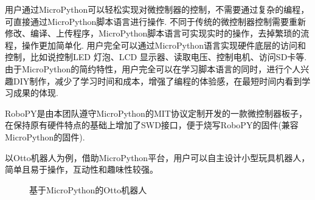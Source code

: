 \documentclass[UTF-8,12pt,a4paper]{ctexart}
\begin{document}
用户通过MicroPython可以轻松实现对微控制器的控制，不需要通过复杂的编程，可直接通过MicroPython脚本语言进行操作.
不同于传统的微控制器控制需要重新修改、编译、上传程序，MicroPython脚本语言可实现实时的操作，去掉繁琐的流程，操作更加简单化.
用户完全可以通过MicroPython语言实现硬件底层的访问和控制，比如说控制LED 灯泡、LCD 显示器、读取电压、控制电机、访问SD卡等.
由于MicroPython的简约特性，用户完全可以在学习脚本语言的同时，进行个人兴趣DIY制作，减少了学习时间和成本，增强了编程的体验感，在最短时间内看到学习成果的体现.

RoboPY是由本团队遵守MicroPython的MIT协议定制开发的一款微控制器板子，在保持原有硬件特点的基础上增加了SWD接口，便于烧写RoboPY的固件(兼容MicroPython的固件).

以Otto机器人为例，借助MicroPython平台，用户可以自主设计小型玩具机器人，简单且易于操作，互动性和趣味性较强。

\begin{figure}[H]
\centering
{}%
%
\caption{基于MicroPython的Otto机器人}
\label{基于MicroPython的Otto机器人}
\end{figure}
\end{document}

